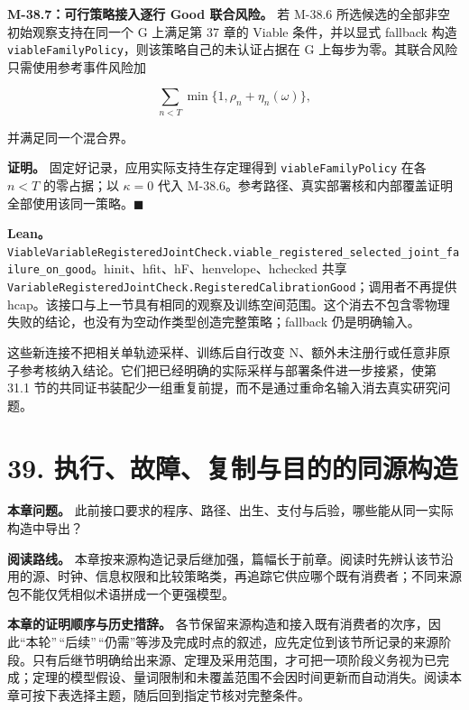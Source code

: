 \documentclass[
  11pt,
  oneside]{book}
\begin{document}
\hypertarget{m-38-7}{}\label{m-38-7}

\textbf{M-38.7：可行策略接入逐行 Good 联合风险。} 若 M-38.6 所选候选的全部非空初始观察支持在同一个 G 上满足第 37 章的 Viable 条件，并以显式 fallback 构造 \nolinkurl{viableFamilyPolicy}，则该策略自己的未认证占据在 G 上每步为零。其联合风险只需使用参考事件风险加

\[\sum_{n<T}\min\{1,\rho_n+\eta_n(\omega)\},\]

并满足同一个混合界。

\textbf{证明。} 固定好记录，应用实际支持生存定理得到 \nolinkurl{viableFamilyPolicy} 在各 \(n<T\) 的零占据；以 \(\kappa=0\) 代入 M-38.6。参考路径、真实部署核和内部覆盖证明全部使用该同一策略。\(\blacksquare\)

\textbf{Lean。} \nolinkurl{ViableVariableRegisteredJointCheck.viable_registered_selected_joint_failure_on_good}。hinit、hfit、hF、henvelope、hchecked 共享 \nolinkurl{VariableRegisteredJointCheck.RegisteredCalibrationGood}；调用者不再提供 hcap。该接口与上一节具有相同的观察及训练空间范围。这个消去不包含零物理失败的结论，也没有为空动作类型创造完整策略；fallback 仍是明确输入。

这些新连接不把相关单轨迹采样、训练后自行改变 N、额外未注册行或任意非原子参考核纳入结论。它们把已经明确的实际采样与部署条件进一步接紧，使第 31.1 节的共同证书装配少一组重复前提，而不是通过重命名输入消去真实研究问题。

\chapter{39. 执行、故障、复制与目的的同源构造}\label{ch-39}

\textbf{本章问题。} 此前接口要求的程序、路径、出生、支付与后验，哪些能从同一实际构造中导出？

\textbf{阅读路线。} 本章按来源构造记录后继加强，篇幅长于前章。阅读时先辨认该节沿用的源、时钟、信息权限和比较策略类，再追踪它供应哪个既有消费者；不同来源包不能仅凭相似术语拼成一个更强模型。

\textbf{本章的证明顺序与历史措辞。} 各节保留来源构造和接入既有消费者的次序，因此``本轮''\,``后续''\,``仍需''等涉及完成时点的叙述，应先定位到该节所记录的来源阶段。只有后继节明确给出来源、定理及采用范围，才可把一项阶段义务视为已完成；定理的模型假设、量词限制和未覆盖范围不会因时间更新而自动消失。阅读本章可按下表选择主题，随后回到指定节核对完整条件。
\end{document}
